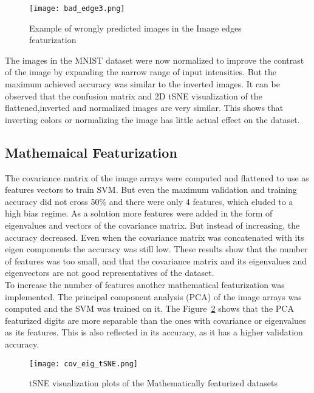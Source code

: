 \documentclass{article}
\begin{document}
\begin{figure}[h]
\centerline{\texttt{[image: bad\_edge3.png]}}
\caption{Example of wrongly predicted images in the Image edges featurization}
\label{bad_edge}
\end{figure}
The images in the MNIST dataset were now normalized to improve the contrast of the image by expanding the narrow range of input intensities. But the maximum achieved accuracy was similar to the inverted images. It can be observed that the confusion matrix and 2D tSNE visualization of the flattened,inverted and normalized images are very similar. This shows that inverting colors or normalizing the image has little actual effect on the dataset.

\subsection{Mathemaical Featurization}
The covariance matrix of the image arrays were computed and flattened to use as features vectors to train SVM. But even the maximum validation and training accuracy did not cross 50\% and there were only 4 features, which eluded to a high bias regime. As a solution more features were added in the form of eigenvalues and vectors of the covariance matrix. But instead of increasing, the accuracy decreased. Even when the covariance matrix was concatenated with its eigen components the accuracy was still low. These results show that the number of features was too small, and that the covariance matrix and its eigenvalues and eigenvectors are not good representatives of the dataset. 
\\
To increase the number of features another mathematical featurization was implemented. The principal component analysis (PCA) of the image arrays was computed and the SVM was trained on it. The Figure~\ref{cov_eig_tSNE} shows that the PCA featurized digits are more separable than the ones with covariance or eigenvalues as its features. This is also reflected in its accuracy, as it has a higher validation accuracy.
\begin{figure}[h]
\centerline{\texttt{[image: cov\_eig\_tSNE.png]}}
\caption{tSNE visualization plots of the Mathematically featurized datasets}
\label{cov_eig_tSNE}
\end{figure}
\end{document}

